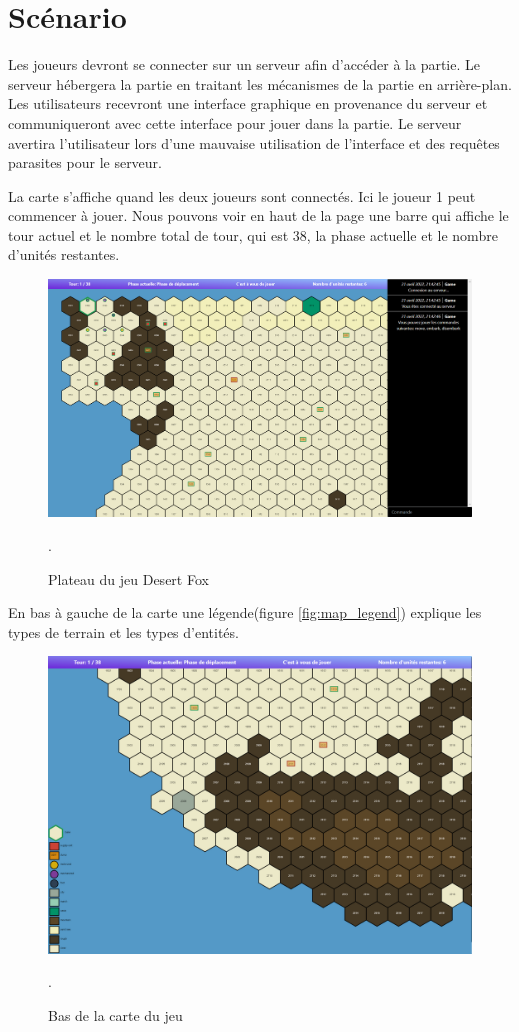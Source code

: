 
\section{Scénario}

Les joueurs devront se connecter sur un serveur afin d'accéder à la partie. Le serveur hébergera la partie en traitant les mécanismes de la partie en arrière-plan. Les utilisateurs recevront une interface graphique en provenance du serveur et communiqueront avec cette interface pour jouer dans la partie.
Le serveur avertira l'utilisateur lors d'une mauvaise utilisation de l'interface et des requêtes parasites pour le serveur.




La carte s'affiche quand les deux joueurs sont connectés. Ici le joueur 1 peut commencer à jouer.
Nous pouvons voir en haut de la page une barre qui affiche le tour actuel et le nombre total de tour, qui est 38, la phase actuelle et le nombre d'unités restantes.

\begin{figure}[H]
    \centering
    \includegraphics[scale=0.35]{data/plateau_du_jeu.png}
    \caption{Plateau du jeu Desert Fox}.
\end{figure}

En bas à gauche de la carte une légende(figure \ref{fig:map_legend}) explique les types de terrain et les types d'entités.\\

\begin{figure}[H]
    \centering
    \includegraphics[scale=0.45]{data/Bas_de_map.png}
    \caption{Bas de la carte du jeu}.
\end{figure}

